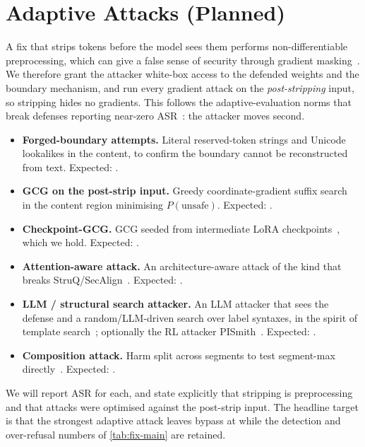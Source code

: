 \section{Adaptive Attacks (Planned)}
\label{sec:adaptive}

A fix that strips tokens before the model sees them performs non-differentiable preprocessing, which can give a false sense of security through gradient masking~\citep{athalye2018obfuscated}.
We therefore grant the attacker white-box access to the defended weights and the boundary mechanism, and run every gradient attack on the \emph{post-stripping} input, so stripping hides no gradients.
This follows the adaptive-evaluation norms that break defenses reporting near-zero ASR~\citep{tramer2020adaptive,nasr2025attacker,jia2025critical}: the attacker moves second.

\begin{itemize}[leftmargin=1.5em,itemsep=2pt]
  \item \textbf{Forged-boundary attempts.} Literal reserved-token strings and Unicode lookalikes in the content, to confirm the boundary cannot be reconstructed from text. Expected: .
  \item \textbf{GCG on the post-strip input.} Greedy coordinate-gradient suffix search~\citep{zou2023universal} in the content region minimising $P(\text{unsafe})$. Expected: .
  \item \textbf{Checkpoint-GCG.} GCG seeded from intermediate LoRA checkpoints~\citep{yang2025auditing}, which we hold. Expected: .
  \item \textbf{Attention-aware attack.} An architecture-aware attack of the kind that breaks StruQ/SecAlign~\citep{pandya2025may}. Expected: .
  \item \textbf{LLM / structural search attacker.} An LLM attacker that sees the defense and a random/LLM-driven search over label syntaxes, in the spirit of template search~\citep{deng2026automating}; optionally the RL attacker PISmith~\citep{yin2026pismith}. Expected: .
  \item \textbf{Composition attack.} Harm split across segments to test segment-max directly~\citep{zhou2026prompt}. Expected: .
\end{itemize}

We will report ASR for each, and state explicitly that stripping is preprocessing and that attacks were optimised against the post-strip input.
The headline target is that the strongest adaptive attack leaves bypass at  while the detection and over-refusal numbers of \cref{tab:fix-main} are retained.
